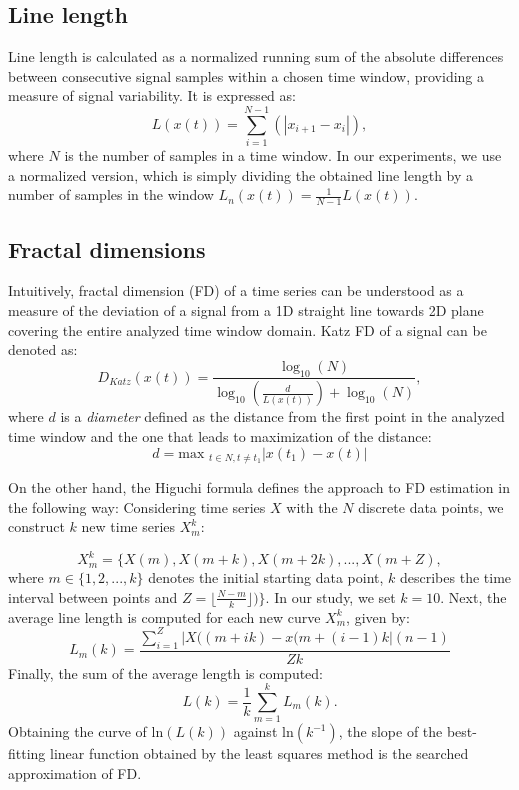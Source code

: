\documentclass[a4paper,fleqn]{cas-sc}
\begin{document}
\subsection{Line length}
Line length is calculated as a normalized running sum of the absolute differences between consecutive signal samples within a chosen time window, providing a measure of signal variability. It is expressed as:
\begin{equation}
    L(x(t))= \sum_{i=1}^{N-1}(|x_{i+1} - x_{i}|),
\end{equation}
where $N$ is the number of samples in a time window. In our experiments, we use a normalized version, which is simply dividing the obtained line length by a number of samples in the window $L_n(x(t)) = \frac{1}{N-1}L(x(t))$.

\subsection{Fractal dimensions}
Intuitively, fractal dimension (FD) of a time series can be understood as a measure of the deviation of a signal from a 1D straight line towards 2D plane covering the entire analyzed time window domain.
Katz FD of a signal can be denoted as:
\begin{equation}
    D_{Katz}(x(t)) = \frac{\log_{10}(N)}{\log_{10}(\frac{d}{L(x(t))})+\log_{10}(N)},
\end{equation}
where $d$ is a \textit{diameter} defined as the distance from the first point in the analyzed time window and the one that leads to maximization of the distance:
\begin{equation}
    d = \text{max }_{t \in N, t\neq{t_1}}|x(t_1) - x(t)|
\end{equation}

On the other hand, the Higuchi formula defines the approach to FD estimation in the following way:
Considering time series $X$ with the $N$ discrete data points, we construct $k$ new time series $X^{k}_{m}$:

\begin{equation}
    X^{k}_{m}=\{ X(m),X(m+k),X(m+2k),..., X(m+Z), 
\end{equation}
where $m \in \{1,2,...,k\}$ denotes the initial starting data point, $k$ describes the time interval between points and $Z=\lfloor \frac{N-m}{k} \rfloor)\}$. In our study, we set $k=10$. Next, the average line length is computed for each new curve $ X^{k}_{m}$, given by:
\begin{equation}
    L_m(k) = \frac{\sum_{i=1}^{Z} |X((m+ik)-x(m+(i-1)k|(n-1)}{Z k}
\end{equation}
Finally, the sum of the average length is computed:
\begin{equation}
    L(k)=\frac{1}{k}\sum_{m=1}^{k} L_{m}(k).
\end{equation}
Obtaining the curve of $\text{ln}(L(k))$ against $\text{ln}(k^{-1})$, the slope of the best-fitting linear function obtained by the least squares method is the searched approximation of FD. 
\end{document}
